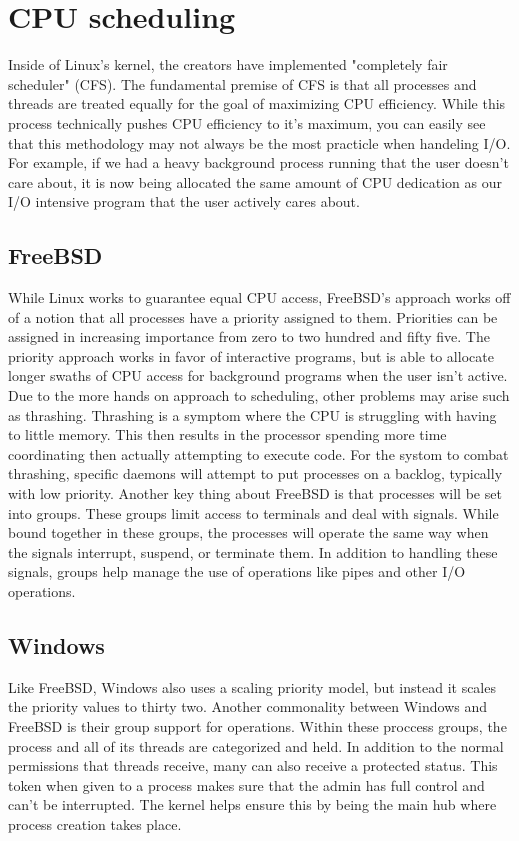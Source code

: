 \documentclass[draftclsnofoot, onecolumn] {report}
\begin{document}
\section{CPU scheduling}
Inside of Linux's kernel, the creators have implemented "completely fair scheduler" (CFS). 
The fundamental premise of CFS is that all processes and threads are treated equally for the goal of maximizing CPU efficiency. 
While this process technically pushes CPU efficiency to it's maximum, you can easily see that this methodology may not always be the most practicle when handeling I/O.
For example, if we had a heavy background process running that the user doesn't care about, it is now being allocated the same amount of CPU dedication as our I/O intensive program that the user actively cares about.

\subsection{FreeBSD}
While Linux works to guarantee equal CPU access, FreeBSD's approach works off of a notion that all processes have a priority assigned to them. 
Priorities can be assigned in increasing importance from zero to two hundred and fifty five.
The priority approach works in favor of interactive programs, but is able to allocate longer swaths of CPU access for background programs when the user isn't active. 
Due to the more hands on approach to scheduling, other problems may arise such as thrashing.
Thrashing is a symptom where the CPU is struggling with having to little memory.
This then results in the processor spending more time coordinating then actually attempting to execute code.
For the systom to combat thrashing, specific daemons will attempt to put processes on a backlog, typically with low priority.
Another key thing about FreeBSD is that processes will be set into groups. 
These groups limit access to terminals and deal with signals.
While bound together in these groups, the processes will operate the same way when the signals interrupt, suspend, or terminate them. 
In addition to handling these signals, groups help manage the use of operations like pipes and other I/O operations. 

\subsection{Windows}
Like FreeBSD, Windows also uses a scaling priority model, but instead it scales the priority values to thirty two. 
Another commonality between Windows and FreeBSD is their group support for operations. 
Within these proccess groups, the process and all of its threads are categorized and held. 
In addition to the normal permissions that threads receive, many can also receive a protected status. 
This token when given to a process makes sure that the admin has full control and can't be interrupted. 
The kernel helps ensure this by being the main hub where process creation takes place.
\end{document}
